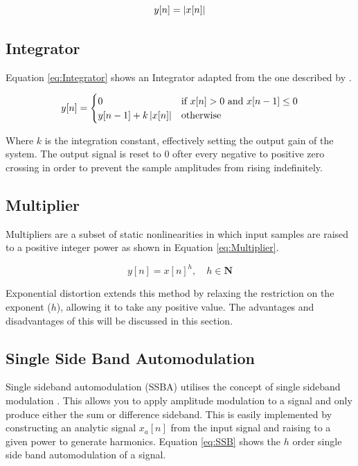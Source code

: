 		\begin{equation}
			y[n] = \left|x[n]\right|
			\label{eq:FullWaveRectification}
		\end{equation}

	\subsection{Integrator}
	\label{sec:Excitation-Methods-Integrator}
		Equation \ref{eq:Integrator} shows an Integrator adapted from the one described by \citet{larsen2004audio}.

		\begin{equation}
			y[n] = \begin{cases}
				0 & \text{if $x[n] > 0$ and $x[n - 1] \leq 0$} \\
				y[n - 1] + k\left|x[n]\right| & \text{otherwise}
			\end{cases}
			\label{eq:Integrator}
		\end{equation}

		Where $k$ is the integration constant, effectively setting the output gain of the system. The output signal
		is reset to 0 ofter every negative to positive zero crossing in order to prevent the sample amplitudes from
		rising indefinitely.

	\subsection{Multiplier}
	\label{sec:Excitation-Methods-Multiplier}
		Multipliers are a subset of static nonlinearities in which input samples are raised to a positive integer
		power as shown in Equation \ref{eq:Multiplier}.

		\begin{equation}
			y[n] = x[n]^{h}, \quad h \in \mathbf{N}
			\label{eq:Multiplier}
		\end{equation}

		Exponential distortion extends this method by relaxing the restriction on the exponent ($h$), allowing it
		to take any positive value. The advantages and disadvantages of this will be discussed in this section.

	\subsection{Single Side Band Automodulation}
	\label{sec:Excitation-Methods-SSBA}
		Single sideband automodulation (SSBA) utilises the concept of single sideband modulation
		\citep{corinthios2009signals}. This allows you to apply amplitude modulation to a signal and only produce
		either the sum or difference sideband. This is easily implemented by constructing an analytic signal
		$x_{a}[n]$ from the input signal and raising to a given power to generate harmonics. Equation \ref{eq:SSB}
		shows the $h$ order single side band automodulation of a signal.


